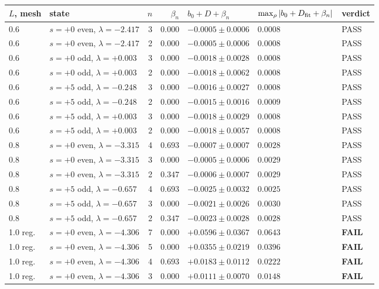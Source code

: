 \begin{tabular}{llrrlll}
\toprule
$L$, mesh & state & $n$ & $\beta_n$ & $b_0+D+\beta_n$ & $\max_\rho|b_0+D_{\rm fit}+\beta_n|$ & verdict \\
\midrule
0.6 & $s=+0$ even, $\lambda=-2.417$ & 3 & $0.000$ & $-0.0005\pm0.0006$ & $0.0008$ & PASS \\
0.6 & $s=+0$ even, $\lambda=-2.417$ & 2 & $0.000$ & $-0.0005\pm0.0006$ & $0.0008$ & PASS \\
0.6 & $s=+0$ odd, $\lambda=+0.003$ & 3 & $0.000$ & $-0.0018\pm0.0028$ & $0.0008$ & PASS \\
0.6 & $s=+0$ odd, $\lambda=+0.003$ & 2 & $0.000$ & $-0.0018\pm0.0062$ & $0.0008$ & PASS \\
0.6 & $s=+5$ odd, $\lambda=-0.248$ & 3 & $0.000$ & $-0.0016\pm0.0027$ & $0.0008$ & PASS \\
0.6 & $s=+5$ odd, $\lambda=-0.248$ & 2 & $0.000$ & $-0.0015\pm0.0016$ & $0.0009$ & PASS \\
0.6 & $s=+5$ odd, $\lambda=+0.003$ & 3 & $0.000$ & $-0.0018\pm0.0029$ & $0.0008$ & PASS \\
0.6 & $s=+5$ odd, $\lambda=+0.003$ & 2 & $0.000$ & $-0.0018\pm0.0057$ & $0.0008$ & PASS \\
0.8 & $s=+0$ even, $\lambda=-3.315$ & 4 & $0.693$ & $-0.0007\pm0.0007$ & $0.0028$ & PASS \\
0.8 & $s=+0$ even, $\lambda=-3.315$ & 3 & $0.000$ & $-0.0005\pm0.0006$ & $0.0029$ & PASS \\
0.8 & $s=+0$ even, $\lambda=-3.315$ & 2 & $0.347$ & $-0.0006\pm0.0007$ & $0.0029$ & PASS \\
0.8 & $s=+5$ odd, $\lambda=-0.657$ & 4 & $0.693$ & $-0.0025\pm0.0032$ & $0.0025$ & PASS \\
0.8 & $s=+5$ odd, $\lambda=-0.657$ & 3 & $0.000$ & $-0.0021\pm0.0026$ & $0.0030$ & PASS \\
0.8 & $s=+5$ odd, $\lambda=-0.657$ & 2 & $0.347$ & $-0.0023\pm0.0028$ & $0.0028$ & PASS \\
1.0 reg. & $s=+0$ even, $\lambda=-4.306$ & 7 & $0.000$ & $+0.0596\pm0.0367$ & $0.0643$ & \textbf{FAIL} \\
1.0 reg. & $s=+0$ even, $\lambda=-4.306$ & 5 & $0.000$ & $+0.0355\pm0.0219$ & $0.0396$ & \textbf{FAIL} \\
1.0 reg. & $s=+0$ even, $\lambda=-4.306$ & 4 & $0.693$ & $+0.0183\pm0.0112$ & $0.0222$ & \textbf{FAIL} \\
1.0 reg. & $s=+0$ even, $\lambda=-4.306$ & 3 & $0.000$ & $+0.0111\pm0.0070$ & $0.0148$ & \textbf{FAIL} \\

\end{tabular}
